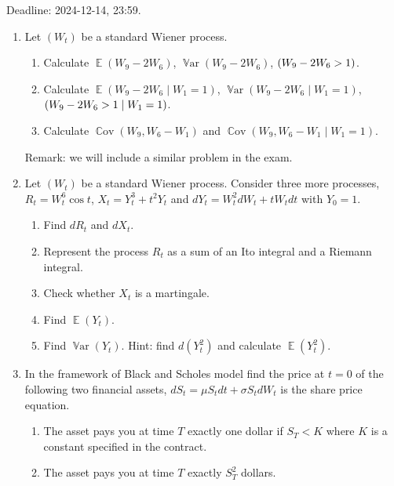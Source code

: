 \documentclass[12pt]{article}
\DeclareMathOperator{\Cov}{\mathbb{C}ov}
\DeclareMathOperator{\Var}{\mathbb{V}ar}
\let\P\relax
\DeclareMathOperator{\P}{\mathbb{P}}
\DeclareMathOperator{\E}{\mathbb{E}}
\begin{document}
Deadline: 2024-12-14, 23:59.

\begin{enumerate}

    \item Let $(W_t)$ be a standard Wiener process.

    \begin{enumerate}
        \item Calculate $\E(W_9 - 2W_6)$, $\Var(W_9 - 2W_6)$, $\P(W_9 - 2W_6 > 1)$.
        \item Calculate $\E(W_9 - 2W_6 \mid W_1 = 1)$, $\Var(W_9 - 2W_6 \mid W_1 = 1)$, $\P(W_9 - 2W_6 > 1 \mid W_1 = 1)$.
        \item Calculate $\Cov(W_9, W_6 - W_1)$ and $\Cov(W_9, W_6 - W_1 \mid W_1 = 1)$.
    \end{enumerate}

    Remark: we will include a similar problem in the exam. 


    \item Let $(W_t)$ be a standard Wiener process.
    Consider three more processes, $R_t = W_t^6 \cos t$, $X_t = Y_t^3 + t^2 Y_t$ and $dY_t = W_t^2 dW_t + tW_t dt$ with $Y_0 = 1$.
    \begin{enumerate}
        \item Find $dR_t$ and $dX_t$.
        \item Represent the process $R_t$ as a sum of an Ito integral and a Riemann integral.
        \item Check whether $X_t$ is a martingale. 
        \item Find $\E(Y_t)$.
        \item Find $\Var(Y_t)$. Hint: find $d(Y_t^2)$ and calculate $\E(Y_t^2)$.
    \end{enumerate}


    \item In the framework of Black and Scholes model find the price at $t=0$ of the following two 
    financial assets, $dS_t = \mu S_t dt + \sigma S_t dW_t$ is the share price equation. 
    \begin{enumerate}
      \item The asset pays you at time $T$ exactly one dollar if $S_T < K$ where $K$ is a constant 
      specified in the contract. 
      \item The asset pays you at time $T$ exactly $S_T^2$ dollars.
    \end{enumerate}
  

\end{enumerate}
\end{document}
